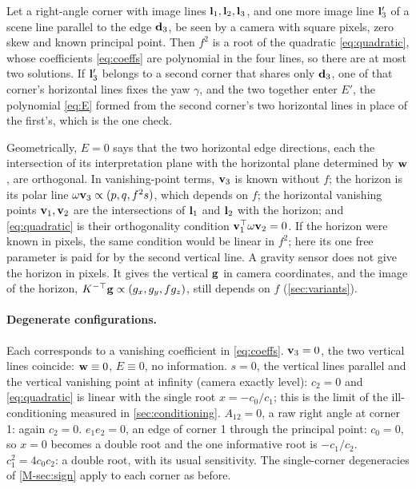 \begin{proposition}\label{prop:Squad}
Let a right-angle corner with image lines $\mathbf{l}_1,\mathbf{l}_2,\mathbf{l}_3$, and one more image line $\mathbf{l}_3'$ of a scene line parallel to the edge $\mathbf{d}_3$, be seen by a camera with square pixels, zero skew and known principal point. Then $f^2$ is a root of the quadratic \eqref{eq:quadratic}, whose coefficients \eqref{eq:coeffs} are polynomial in the four lines, so there are at most two solutions. If $\mathbf{l}_3'$ belongs to a second corner that shares only $\mathbf{d}_3$, one of that corner's horizontal lines fixes the yaw $\gamma$, and the two together enter $E'$, the polynomial \eqref{eq:E} formed from the second corner's two horizontal lines in place of the first's, which is the one check.
\end{proposition}

Geometrically, $E=0$ says that the two horizontal edge directions, each the intersection of its interpretation plane with the horizontal plane determined by $\mathbf{w}$, are orthogonal. In vanishing-point terms, $\mathbf{v}_3$ is known without $f$; the horizon is its polar line $\omega\mathbf{v}_3\propto(p,q,f^2s)$, which depends on $f$; the horizontal vanishing points $\mathbf{v}_1,\mathbf{v}_2$ are the intersections of $\mathbf{l}_1$ and $\mathbf{l}_2$ with the horizon; and \eqref{eq:quadratic} is their orthogonality condition $\mathbf{v}_1^{\top}\omega\mathbf{v}_2=0$. If the horizon were known in pixels, the same condition would be linear in $f^2$; here its one free parameter is paid for by the second vertical line. A gravity sensor does not give the horizon in pixels. It gives the vertical $\mathbf{g}$ in camera coordinates, and the image of the horizon, $K^{-\top}\mathbf{g}\propto(g_x,g_y,f g_z)$, still depends on $f$ (\cref{sec:variants}).

\paragraph{Degenerate configurations.} Each corresponds to a vanishing coefficient in \eqref{eq:coeffs}. $\mathbf{v}_3=0$, the two vertical lines coincide: $\mathbf{w}\equiv0$, $E\equiv0$, no information. $s=0$, the vertical lines parallel and the vertical vanishing point at infinity (camera exactly level): $c_2=0$ and \eqref{eq:quadratic} is linear with the single root $x=-c_0/c_1$; this is the limit of the ill-conditioning measured in \cref{sec:conditioning}. $A_{12}=0$, a raw right angle at corner 1: again $c_2=0$. $e_1e_2=0$, an edge of corner 1 through the principal point: $c_0=0$, so $x=0$ becomes a double root and the one informative root is $-c_1/c_2$. $c_1^2=4c_0c_2$: a double root, with its usual sensitivity. The single-corner degeneracies of \cref{M-sec:sign} apply to each corner as before.

